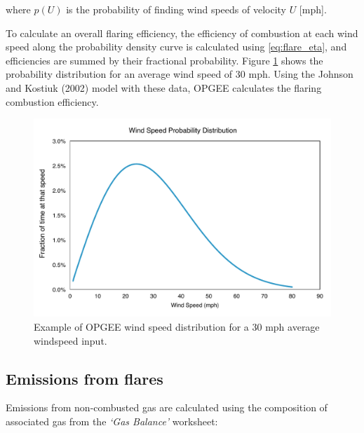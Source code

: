 \documentclass[11pt]{report}
\newcommand{\sheet}[1]{\textit{`{#1}'}}
\begin{document}
where $p(U)$ is the probability of finding wind speeds of velocity $U$ [mph].

To calculate an overall flaring efficiency, the efficiency of combustion at each wind speed along the probability density curve is calculated using \eqref{eq:flare_eta}, and efficiencies are summed by their fractional probability. Figure \ref{fig:wind_example} shows the probability distribution for an average wind speed of 30 mph.
Using the Johnson and Kostiuk (2002) model with these data, OPGEE calculates the flaring combustion efficiency. 

\begin{figure}[t]
\includegraphics[width=1\columnwidth]{images/wind30mph.pdf}
\caption{Example of OPGEE wind speed distribution for a 30 mph average windspeed input.}
\label{fig:wind_example}
\end{figure}


\subsection{Emissions from flares}

Emissions from non-combusted gas are calculated using the composition of associated gas from the \sheet{Gas Balance} worksheet:
\end{document}
